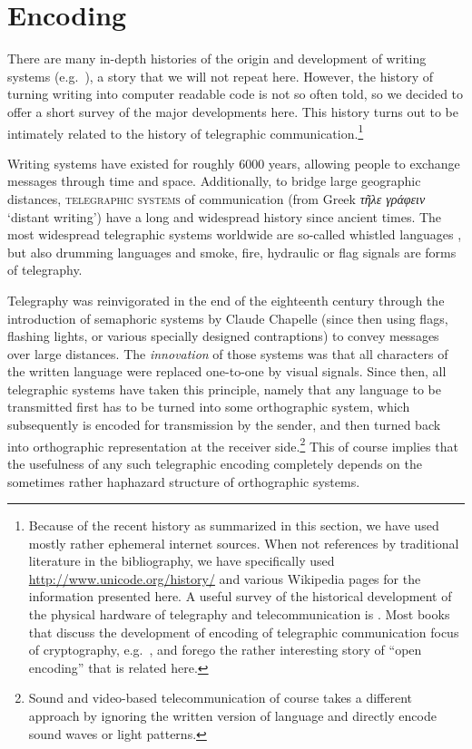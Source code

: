 \chapter{Encoding} \label{encoding}

There are many in-depth histories of the origin and development of writing
systems (e.g.~\citet{Robinson1997,Powell2012}), a story that we will not repeat
here. However, the history of turning writing into computer readable code is not
so often told, so we decided to offer a short survey of the major developments
here. This history turns out to be intimately related to the history of
telegraphic communication.\footnote{Because of the recent history as summarized
in this section, we have used mostly rather ephemeral internet sources. When not
references by traditional literature in the bibliography, we have specifically
used \url{http://www.unicode.org/history/} and various Wikipedia pages for the
information presented here. A useful survey of the historical development of the
physical hardware of telegraphy and telecommunication is \citet{Huurdeman2003}.
Most books that discuss the development of encoding of telegraphic communication
focus of cryptography, e.g.~\citet{Singh1999}, and forego the rather interesting
story of ``open encoding'' that is related here.}

Writing systems have existed for roughly 6000 years, allowing people to exchange
messages through time and space. Additionally, to bridge large geographic
distances, \textsc{telegraphic systems} of communication (from Greek \emph{τῆλε
γράφειν} `distant writing') have a long and widespread history since ancient
times. The most widespread telegraphic systems worldwide are so-called whistled
languages \citep{Meyer2015}, but also drumming languages \citep{Meyer_etal2012}
and smoke, fire, hydraulic or flag signals are forms of telegraphy.

Telegraphy was reinvigorated in the end of the eighteenth century through the
introduction of semaphoric systems by Claude Chapelle (since then using flags,
flashing lights, or various specially designed contraptions) to convey messages
over large distances. The \textit{innovation} of those systems was that all
characters of the written language were replaced one-to-one by visual signals.
Since then, all telegraphic systems have taken this principle, namely that any
language to be transmitted first has to be turned into some orthographic system,
which subsequently is encoded for transmission by the sender, and then turned
back into orthographic representation at the receiver side.\footnote{Sound and
video-based telecommunication of course takes a different approach by ignoring
the written version of language and directly encode sound waves or light
patterns.} This of course implies that the usefulness of any such telegraphic
encoding completely depends on the sometimes rather haphazard structure of
orthographic systems.

